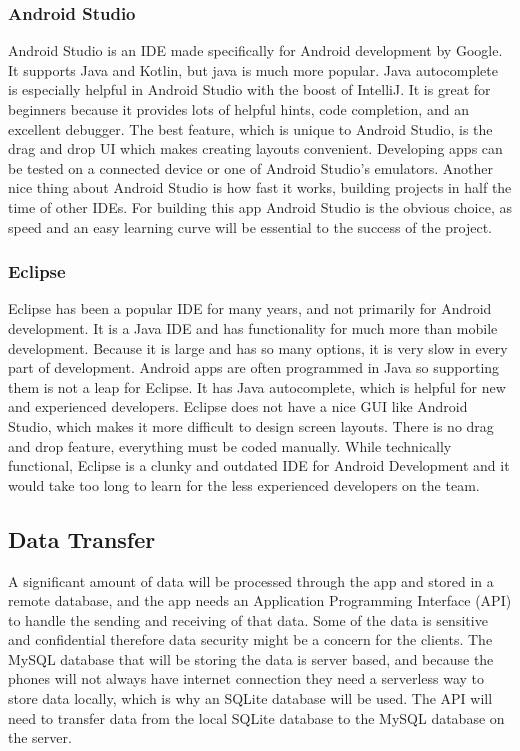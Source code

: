\documentclass[onecolumn, draftclsnofoot,10pt, compsoc]{IEEEtran}
\begin{document}
\subsubsection{Android Studio}
Android Studio is an IDE made specifically for Android development by Google. 
It supports Java and Kotlin, but java is much more popular. 
Java autocomplete is especially helpful in Android Studio with the boost of IntelliJ. 
It is great for beginners because it provides lots of helpful hints, code completion, and an excellent debugger. 
The best feature, which is unique to Android Studio, is the drag and drop UI which makes creating layouts convenient. 
Developing apps can be tested on a connected device or one of Android Studio's emulators. 
Another nice thing about Android Studio is how fast it works, building projects in half the time of other IDEs. 
For building this app Android Studio is the obvious choice, as speed and an easy learning curve will be essential to the success of the project. 
\cite{Studios, Eclipse}

\subsubsection{Eclipse}
Eclipse has been a popular IDE for many years, and not primarily for Android development. 
It is a Java IDE and has functionality for much more than mobile development. 
Because it is large and has so many options, it is very slow in every part of development. 
Android apps are often programmed in Java so supporting them is not a leap for Eclipse. 
It has Java autocomplete, which is helpful for new and experienced developers. 
Eclipse does not have a nice GUI like Android Studio, which makes it more difficult to design screen layouts. 
There is no drag and drop feature, everything must be coded manually. 
While technically functional, Eclipse is a clunky and outdated IDE for Android Development and it would take too long to learn for the less experienced developers on the team. 
\cite{Eclipse}

\subsection{Data Transfer}
A significant amount of data will be processed through the app and stored in a remote database, and the app needs an Application Programming Interface (API) to handle the sending and receiving of that data. 
Some of the data is sensitive and confidential therefore data security might be a concern for the clients. 
The MySQL database that will be storing the data is server based, and because the phones will not always have internet connection they need a serverless way to store data locally, which is why an SQLite database will be used. The API will need to transfer data from the local SQLite database to the MySQL database on the server. 
\end{document}
